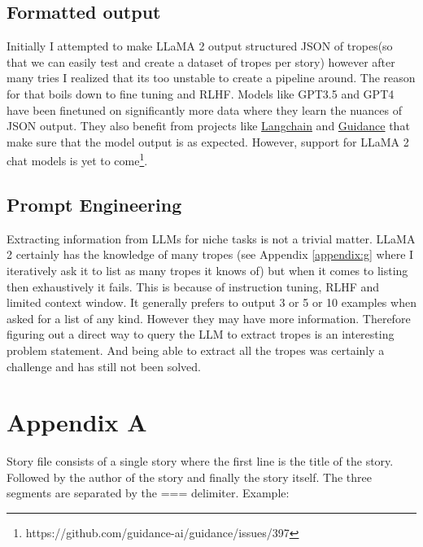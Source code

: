 \documentclass[11pt]{article}
\begin{document}
\subsection{Formatted output}
Initially I attempted to make LLaMA 2 output structured JSON of tropes(so that we can easily test and create a dataset of tropes per story) however after many tries I realized that its too unstable to create a pipeline around. The reason for that boils down to fine tuning and RLHF. Models like GPT3.5 and GPT4 have been finetuned on significantly more data where they learn the nuances of JSON output. They also benefit from projects like \href{https://github.com/langchain-ai/langchain}{Langchain} and \href{https://github.com/guidance-ai/guidance}{Guidance} that make sure that the model output is as expected. However, support for LLaMA 2 chat models is yet to come\footnote[1]{https://github.com/guidance-ai/guidance/issues/397\label{issue}}.

\subsection{Prompt Engineering}
Extracting information from LLMs for niche tasks is not a trivial matter. LLaMA 2 certainly has the knowledge of many tropes (see Appendix \ref{appendix:g} where I iteratively ask it to list as many tropes it knows of) but when it comes to listing then exhaustively it fails. This is because of instruction tuning, RLHF and limited context window. It generally prefers to output 3 or 5 or 10 examples when asked for a list of any kind. However they may have more information. Therefore figuring out a direct way to query the LLM to extract tropes is an interesting problem statement. And being able to extract all the tropes was certainly a challenge and has still not been solved. 

\printbibliography
\clearpage
\appendix
\section{Appendix A}
\label{appendix:a}
Story file consists of a single story where the first line is the title of the story. Followed by the author of the story and finally the story itself. The three segments are separated by the === delimiter. Example: 
\end{document}
